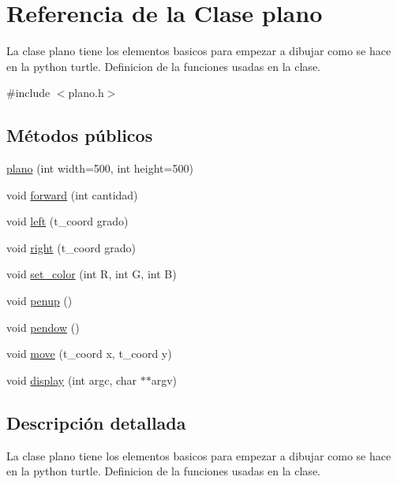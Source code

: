 \hypertarget{classplano}{}\section{Referencia de la Clase plano}
\label{classplano}


La clase plano tiene los elementos basicos para empezar a dibujar como se hace en la python turtle.  Definicion de la funciones usadas en la clase.  




{\ttfamily \#include $<$plano.\+h$>$}

\subsection*{Métodos públicos}
\begin{DoxyCompactItemize}
\item 
\hyperlink{classplano_a07a6173550219cbe2d32925afac542a5}{plano} (int width=500, int height=500)
\item 
void \hyperlink{classplano_a2febab8f233098b881ced3f4553526f2}{forward} (int cantidad)
\item 
void \hyperlink{classplano_ad5f11338792271b961051f7eff80c4cc}{left} (t\+\_\+coord grado)
\item 
void \hyperlink{classplano_a350bd814b14e4a876b601e608c4b7217}{right} (t\+\_\+coord grado)
\item 
void \hyperlink{classplano_a5758a4e96e2140941dd150e91e6029fd}{set\+\_\+color} (int R, int G, int B)
\item 
void \hyperlink{classplano_a48e4fbc9361ecaffe8a18545825ae19b}{penup} ()
\item 
void \hyperlink{classplano_aa2ae0a48000f85adfc61663ae7011aa2}{pendow} ()
\item 
void \hyperlink{classplano_a87e7fce6efc52d9b8c1e0c8946b1c2bb}{move} (t\+\_\+coord x, t\+\_\+coord y)
\item 
void \hyperlink{classplano_aa17e44a9925d265425e883f3bd8c1565}{display} (int argc, char $\ast$$\ast$argv)
\end{DoxyCompactItemize}


\subsection{Descripción detallada}
La clase plano tiene los elementos basicos para empezar a dibujar como se hace en la python turtle.  Definicion de la funciones usadas en la clase. 

